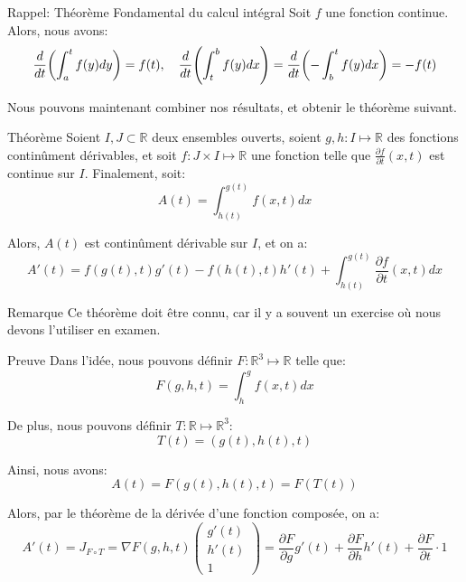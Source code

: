 \documentclass[a4paper]{article}
\begin{document}
\begin{parag}{Rappel: Théorème Fondamental du calcul intégral}
    Soit $f$ une fonction continue. Alors, nous avons:
    \[\frac{d}{dt}\left(\int_{a}^{t} f\left(y\right)dy\right) = f\left(t\right), \mathspace \frac{d}{dt}\left(\int_{t}^{b} f\left(y\right)dx\right) = \frac{d}{dt}\left(- \int_{b}^{t} f\left(y\right) dx\right) = -f\left(t\right)\]

    Nous pouvons maintenant combiner nos résultats, et obtenir le théorème suivant.
\end{parag}

\begin{parag}{Théorème}
    Soient $I, J \subset \mathbb{R}$ deux ensembles ouverts, soient $g, h : I \mapsto \mathbb{R}$ des fonctions continûment dérivables, et soit $f : J \times I \mapsto \mathbb{R}$ une fonction telle que $\frac{\partial f}{\partial t}\left(x, t\right)$ est continue sur $I$. Finalement, soit: 
    \[A\left(t\right) = \int_{h\left(t\right)}^{g\left(t\right)} f\left(x, t\right)dx\]
    
    Alors, $A\left(t\right)$ est continûment dérivable sur $I$, et on a: 
    \[A'\left(t\right) = f\left(g\left(t\right), t\right) g'\left(t\right) - f\left(h\left(t\right), t\right)h'\left(t\right) + \int_{h\left(t\right)}^{g\left(t\right)} \frac{\partial f}{\partial t}\left(x, t\right)dx \]
    
    \begin{subparag}{Remarque}
        Ce théorème doit être connu, car il y a souvent un exercise où nous devons l'utiliser en examen.
    \end{subparag}

    \begin{subparag}{Preuve}
        Dans l'idée, nous pouvons définir $F : \mathbb{R}^3 \mapsto \mathbb{R}$ telle que:
        \[F\left(g, h, t\right) = \int_{h}^{g} f\left(x, t\right)dx\]

        De plus, nous pouvons définir $T : \mathbb{R} \mapsto \mathbb{R}^3$:
        \[T\left(t\right) = \left(g\left(t\right), h\left(t\right), t\right)\]

        Ainsi, nous avons:
        \[A\left(t\right) = F\left(g\left(t\right), h\left(t\right), t\right) = F\left(T\left(t\right)\right)\]

        Alors, par le théorème de la dérivée d'une fonction composée, on a:
        \[A'\left(t\right) = J_{F \circ T} = \nabla F\left(g, h, t\right) \begin{pmatrix} g'\left(t\right) \\ h'\left(t\right) \\ 1 \end{pmatrix} = \frac{\partial F}{\partial g}g'\left(t\right) + \frac{\partial F}{\partial h} h'\left(t\right) + \frac{\partial F}{\partial t}\cdot 1\]


\end{subparag}
\end{parag}
\end{document}
